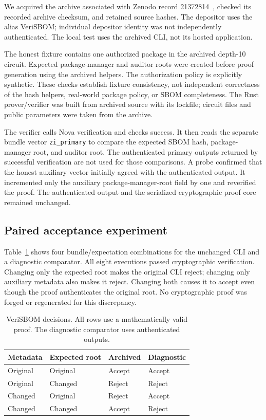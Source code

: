 \documentclass[sigconf,nonacm]{acmart}
\begin{document}
We acquired the archive associated with Zenodo record 21372814~\cite{veriartifact}, checked its recorded archive checksum, and retained source hashes. The depositor uses the alias VeriSBOM; individual depositor identity was not independently authenticated. The local test uses the archived CLI, not its hosted application.

The honest fixture contains one authorized package in the archived depth-10 circuit. Expected package-manager and auditor roots were created before proof generation using the archived helpers. The authorization policy is explicitly synthetic. These checks establish fixture consistency, not independent correctness of the hash helpers, real-world package policy, or SBOM completeness. The Rust prover/verifier was built from archived source with its lockfile; circuit files and public parameters were taken from the archive.

The verifier calls Nova verification and checks success. It then reads the separate bundle vector \texttt{zi\_primary} to compare the expected SBOM hash, package-manager root, and auditor root. The authenticated primary outputs returned by successful verification are not used for those comparisons. A probe confirmed that the honest auxiliary vector initially agreed with the authenticated output. It incremented only the auxiliary package-manager-root field by one and reverified the proof. The authenticated output and the serialized cryptographic proof core remained unchanged.

\subsection{Paired acceptance experiment}
Table~\ref{tab:veri} shows four bundle/expectation combinations for the unchanged CLI and a diagnostic comparator. All eight executions passed cryptographic verification. Changing only the expected root makes the original CLI reject; changing only auxiliary metadata also makes it reject. Changing both causes it to accept even though the proof authenticates the original root. No cryptographic proof was forged or regenerated for this discrepancy.

\begin{table}[t]
\caption{VeriSBOM decisions. All rows use a mathematically valid proof. The diagnostic comparator uses authenticated outputs.}
\label{tab:veri}
\centering\small
\begin{tabular}{@{}llll@{}}
\toprule Metadata & Expected root & Archived & Diagnostic \\
\midrule
Original & Original & Accept & Accept \\
Original & Changed & Reject & Reject \\
Changed & Original & Reject & Accept \\
Changed & Changed & Accept & Reject \\
\bottomrule
\end{tabular}
\end{table}
\end{document}
